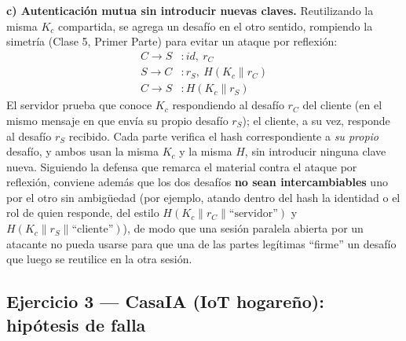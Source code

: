 \textbf{c) Autenticación mutua sin introducir nuevas claves.}
Reutilizando la misma $K_c$ compartida, se agrega un desafío en el otro sentido,
rompiendo la simetría (Clase 5, Primer Parte) para evitar un ataque por
reflexión:
\begin{align*}
C \to S &: id,\ r_C\\
S \to C &: r_S,\ H(K_c\|r_C)\\
C \to S &: H(K_c\|r_S)
\end{align*}
El servidor prueba que conoce $K_c$ respondiendo al desafío $r_C$ del cliente (en
el mismo mensaje en que envía su propio desafío $r_S$); el cliente, a su vez,
responde al desafío $r_S$ recibido. Cada parte verifica el hash correspondiente a
\emph{su propio} desafío, y ambos usan la misma $K_c$ y la misma $H$, sin
introducir ninguna clave nueva. Siguiendo la defensa que remarca el material
contra el ataque por reflexión, conviene además que los dos desafíos \textbf{no
sean intercambiables} uno por el otro sin ambigüedad (por ejemplo, atando dentro
del hash la identidad o el rol de quien responde, del estilo
$H(K_c\|r_C\|\text{``servidor''})$ y $H(K_c\|r_S\|\text{``cliente''})$), de modo
que una sesión paralela abierta por un atacante no pueda usarse para que una de
las partes legítimas ``firme'' un desafío que luego se reutilice en la otra
sesión.

\subsection{Ejercicio 3 --- CasaIA (IoT hogareño): hipótesis de falla}


